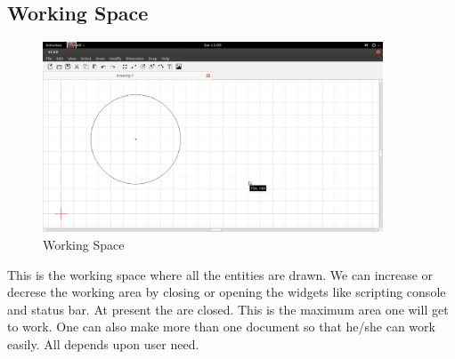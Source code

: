 \subsection{Working Space}
\begin{figure}[h!]
\centering
\includegraphics[width=0.9\textwidth]{images/drawingarea.png} 
\caption{Working Space}
\end{figure}
This is the working space where all the entities are drawn. We can increase or decrese the working area by closing or opening the widgets like scripting console and status bar. At present the are closed. This is the maximum area one will get to work. One can also make more than one document so that he/she can work easily. All depends upon user need.
